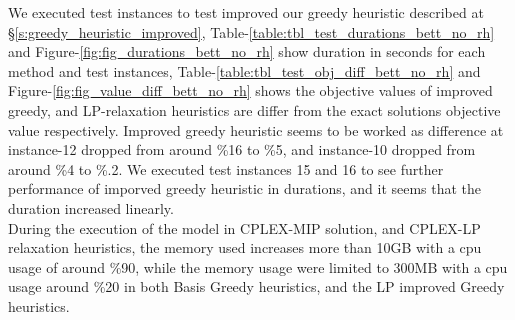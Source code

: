 \documentclass[11pt]{article}
\begin{document}
We executed test instances to test improved our greedy heuristic described at \S \ref{s:greedy_heuristic_improved}, Table-\ref{table:tbl_test_durations_bett_no_rh} and Figure-\ref{fig:fig_durations_bett_no_rh} show duration in seconds for each method and test instances, Table-\ref{table:tbl_test_obj_diff_bett_no_rh} and Figure-\ref{fig:fig_value_diff_bett_no_rh} shows the objective values of improved greedy, and LP-relaxation heuristics are differ from the exact solutions objective value respectively. Improved greedy heuristic seems to be worked as difference at instance-12 dropped from around \%16 to \%5, and instance-10 dropped from around \%4 to \%.2. We executed test instances 15 and 16 to see further performance of imporved greedy heuristic in durations, and it seems that the duration increased linearly.\\

During the execution of the model in CPLEX-MIP solution, and CPLEX-LP relaxation heuristics, the memory used increases more than 10GB with a cpu usage of around \%90, while the memory usage were limited to 300MB with a cpu usage around \%20 in both Basis Greedy heuristics, and the LP improved Greedy heuristics.\\

\end{document}
